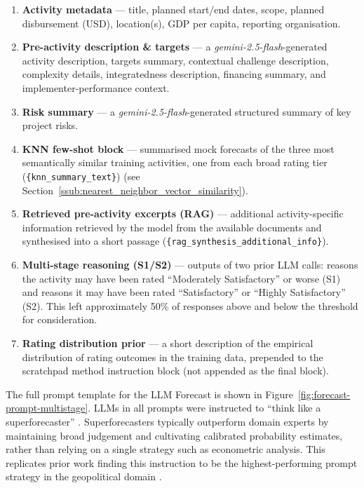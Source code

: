 \documentclass[12pt,a4paper]{article}
\let\citep\parencite
\begin{document}
\begin{enumerate}[noitemsep,topsep=2pt]
  \item \textbf{Activity metadata} --- title, planned start/end dates, scope, planned disbursement (USD), location(s), GDP per capita, reporting organisation.
  \item \textbf{Pre-activity description \& targets} --- a \emph{gemini-2.5-flash}-generated activity description, targets summary, contextual challenge description, complexity details, integratedness description, financing summary, and implementer-performance context.
  \item \textbf{Risk summary} --- a \emph{gemini-2.5-flash}-generated structured summary of key project risks.
  \item \textbf{KNN few-shot block} --- summarised mock forecasts of the three most semantically similar training activities, one from each broad rating tier  (\texttt{\{knn\_summary\_text\}}) (see Section~\ref{ssub:nearest_neighbor_vector_similarity}).
  \item \textbf{Retrieved pre-activity excerpts (RAG)} --- additional activity-specific information retrieved by the model from the available documents and synthesised into a short passage (\texttt{\{rag\_synthesis\_additional\_info\}}).
  \item \textbf{Multi-stage reasoning (S1/S2)} --- outputs of two prior LLM calls: reasons the activity may have been rated ``Moderately Satisfactory'' or worse (S1) and reasons it may have been rated ``Satisfactory'' or ``Highly Satisfactory'' (S2). This left approximately 50\% of responses above and below the threshold for consideration.
  \item \textbf{Rating distribution prior} --- a short description of the empirical distribution of rating outcomes in the training data, prepended to the scratchpad method instruction block (not appended as the final block).
\end{enumerate}

The full prompt template for the LLM Forecast is shown in Figure~\ref{fig:forecast-prompt-multistage}. LLMs in all prompts were instructed to ``think like a superforecaster'' \citep{tetlockSuperforecastingArtScience2015}. Superforecasters typically outperform domain experts by maintaining broad judgement and cultivating calibrated probability estimates, rather than relying on a single strategy such as econometric analysis. This replicates prior work finding this instruction to be the highest-performing prompt strategy in the geopolitical domain \citep{halawiApproachingHumanLevelForecasting2024}.
\end{document}
